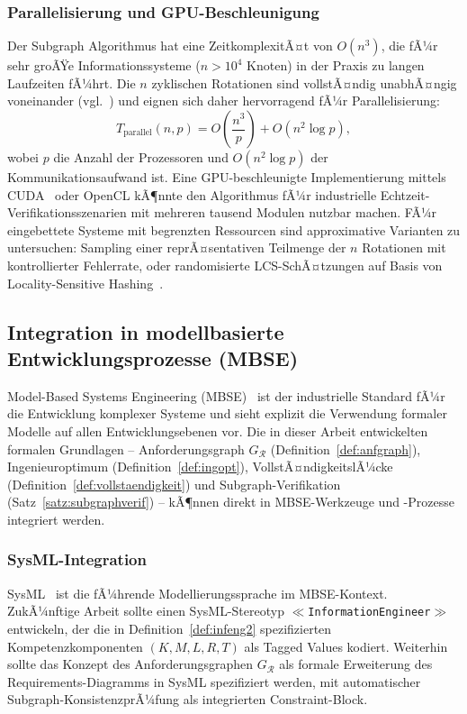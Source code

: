 ﻿\documentclass[a4paper,12pt]{article}
\theoremstyle{definition}
\begin{document}
\subsubsection{Parallelisierung und GPU-Beschleunigung}

Der Subgraph Algorithmus hat eine ZeitkomplexitÃ¤t von $O(n^3)$, die fÃ¼r sehr groÃŸe
Informationssysteme ($n > 10^4$ Knoten) in der Praxis zu langen Laufzeiten fÃ¼hrt.
Die $n$ zyklischen Rotationen sind vollstÃ¤ndig unabhÃ¤ngig voneinander
(vgl.~\cite{subgraph2026}) und eignen sich daher hervorragend fÃ¼r Parallelisierung:
\[
  T_{\text{parallel}}(n, p) = O\!\left(\frac{n^3}{p}\right) + O(n^2 \log p),
\]
wobei $p$ die Anzahl der Prozessoren und $O(n^2 \log p)$ der Kommunikationsaufwand ist.
Eine GPU-beschleunigte Implementierung mittels CUDA~\cite{cuda2023} oder OpenCL kÃ¶nnte
den Algorithmus fÃ¼r industrielle Echtzeit-Verifikationsszenarien mit mehreren tausend
Modulen nutzbar machen. FÃ¼r eingebettete Systeme mit begrenzten Ressourcen sind
approximative Varianten zu untersuchen: Sampling einer reprÃ¤sentativen Teilmenge der
$n$ Rotationen mit kontrollierter Fehlerrate, oder randomisierte LCS-SchÃ¤tzungen
auf Basis von Locality-Sensitive Hashing~\cite{indyk1998}.

\subsection{Integration in modellbasierte Entwicklungsprozesse (MBSE)}

Model-Based Systems Engineering (MBSE)~\cite{friedenthal2011} ist der industrielle
Standard fÃ¼r die Entwicklung komplexer Systeme und sieht explizit die Verwendung
formaler Modelle auf allen Entwicklungsebenen vor. Die in dieser Arbeit entwickelten
formalen Grundlagen -- Anforderungsgraph $G_\mathcal{R}$ (Definition~\ref{def:anfgraph}),
Ingenieuroptimum (Definition~\ref{def:ingopt}), VollstÃ¤ndigkeitslÃ¼cke
(Definition~\ref{def:vollstaendigkeit}) und Subgraph-Verifikation
(Satz~\ref{satz:subgraphverif}) -- kÃ¶nnen direkt in MBSE-Werkzeuge und -Prozesse
integriert werden.

\subsubsection{SysML-Integration}

SysML~\cite{sysml2019} ist die fÃ¼hrende Modellierungssprache im MBSE-Kontext.
ZukÃ¼nftige Arbeit sollte einen SysML-Stereotyp \texttt{$\ll$InformationEngineer$\gg$}
entwickeln, der die in Definition~\ref{def:infeng2} spezifizierten Kompetenzkomponenten
$(K, M, L, R, T)$ als Tagged Values kodiert. Weiterhin sollte das Konzept des
Anforderungsgraphen $G_\mathcal{R}$ als formale Erweiterung des Requirements-Diagramms
in SysML spezifiziert werden, mit automatischer Subgraph-KonsistenzprÃ¼fung als
integrierten Constraint-Block.
\end{document}
